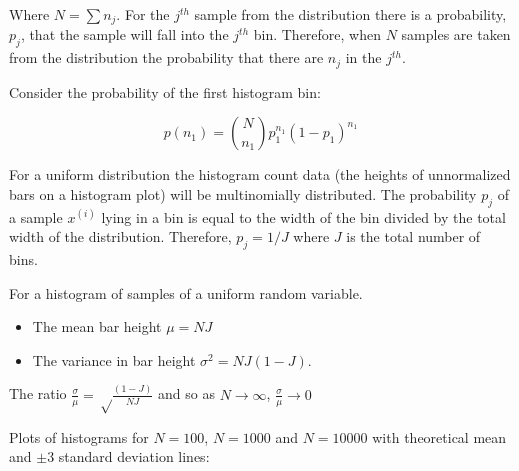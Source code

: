 \documentclass[12pt]{article}
\begin{document}
Where $N = \sum n_j$. For the $j^{th}$ sample from the distribution there is a probability, $p_j$, that the sample will fall into the $j^{th}$ bin.
Therefore, when $N$ samples are taken from the distribution the probability that there are $n_j$ in the $j^{th}$.

Consider the probability of the first histogram bin:

\begin{equation}
	p(n_1) = \binom{N}{n_1} p_1^{n_1} (1-p_1)^{n_1}
\end{equation}



For a uniform distribution the histogram count data (the heights of unnormalized bars on a histogram plot) will be multinomially distributed. The probability $p_j$ of a sample  $x^{(i)}$ lying in a bin is equal to the width of the bin divided by the total width of the distribution. Therefore, $p_j = 1/J$ where $J$ is the total number of bins.

For a histogram of samples of a uniform random variable.

\begin{itemize}
\item The mean bar height  $\mu = NJ$
\item The variance in bar height $\sigma^2 = NJ(1-J)$.
\end{itemize}


The ratio $\frac \sigma \mu = \sqrt \frac{(1-J)}{NJ}$ and so as $N \to \infty$, $\frac \sigma \mu \to 0$


Plots of histograms for $N=100$,  $N=1000$ and $N=10000$ with theoretical mean  and $\pm 3$ standard deviation lines:
\end{document}
